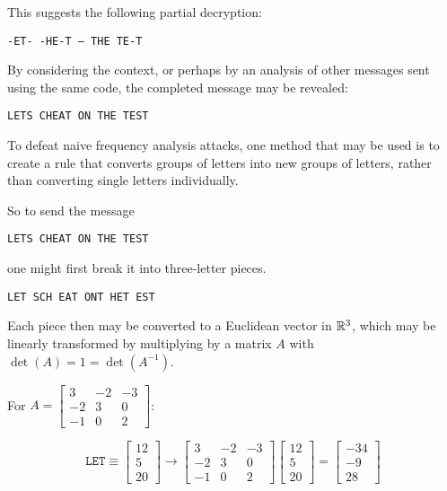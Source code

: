 \begin{applicationActivities}
\begin{observation}
\vspace{1em}

This suggests the following partial decryption:
\begin{center}\texttt{-ET- -HE-T -- THE TE-T}\end{center}

By considering the context, or perhaps by an analysis of other messages
sent using the same code, the completed message may be revealed:
\begin{center}\texttt{LETS CHEAT ON THE TEST}\end{center}
\end{observation}

\begin{remark}
To defeat naive frequency analysis attacks, one method that may be
used is to create a rule that converts groups of letters into
new groups of letters, rather than converting single letters
individually.

\vspace{1em}

So to send the message 
\begin{center}\texttt{LETS CHEAT ON THE TEST}\end{center}
one might first break it into three-letter pieces.
\begin{center}\texttt{LET SCH EAT ONT HET EST}\end{center}
\end{remark}

\begin{remark}
Each piece then may be converted to a Euclidean vector in \(\mathbb{R}^3\),
which may be linearly transformed by multiplying by a matrix \(A\)
with \(\det(A)=1=\det(A^{-1})\).

\vspace{1em}

For \(A=\begin{bmatrix}3&-2&-3\\-2&3&0\\-1&0&2\end{bmatrix}\):

\[
\mathtt{LET}\equiv
\begin{bmatrix}12\\5\\20\end{bmatrix}\to
\begin{bmatrix}3&-2&-3\\-2&3&0\\-1&0&2\end{bmatrix}\begin{bmatrix}12\\5\\20\end{bmatrix}=
\begin{bmatrix}-34\\-9\\28\end{bmatrix}
\]
\end{remark}


\end{applicationActivities}
